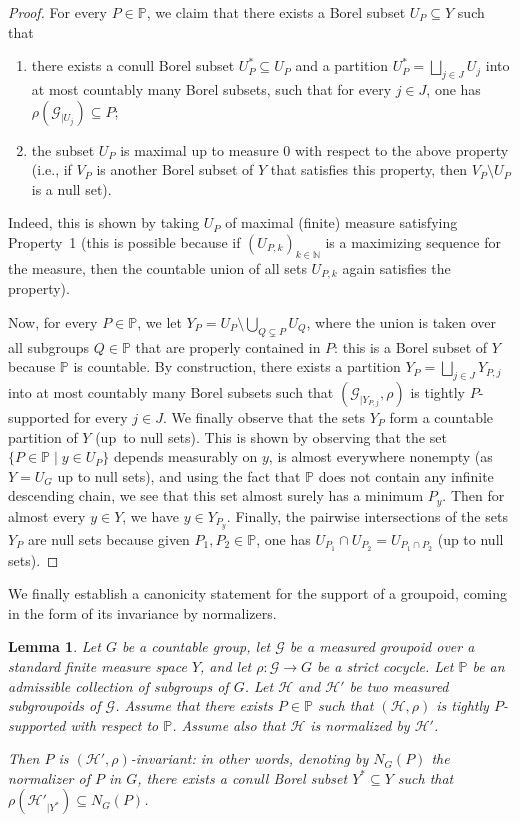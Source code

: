 \documentclass[11pt]{article}
\newcommand{\ie}{i.e.,\xspace}
\numberwithin{equation}{section}
\let\mathcal\mathscr
\theoremstyle{plain}
\newtheorem{lemma}[theo]{Lemma}
\theoremstyle{definition}
\let\Dunion\bigsqcup
\newcommand{\calg}{\mathcal{G}}
\newcommand{\calh}{\mathcal{H}}
\begin{document}
\begin{proof}
For every $P\in\mathbb{P}$, we claim that there exists a Borel subset $U_P\subseteq Y$ such that
\begin{enumerate}
\item there exists a conull Borel subset $U_P^*\subseteq U_P$ and a partition $U_P^*=\Dunion_{j\in J} U_j$ into at most countably many Borel subsets, such that for every $j\in J$, one has $\rho(\calg_{|U_j})\subseteq P$;
\item the subset $U_P$ is maximal up to measure $0$ with respect to the above property (\ie if $V_P$ is another Borel subset of $Y$ that satisfies this property, then $V_P\setminus U_P$ is a null set).
\end{enumerate}
Indeed, this is shown by taking $U_P$ of maximal (finite) measure satisfying Property~1 (this is possible because if $(U_{P,k})_{k\in\mathbb{N}}$ is a maximizing sequence for the measure, then the countable union of all sets $U_{P,k}$ again satisfies the property).

Now, for every $P\in\mathbb{P}$, we let $Y_P=U_P\setminus\bigcup_{Q\subsetneq P} U_Q$, where the union is taken over all subgroups $Q\in\mathbb{P}$ that are properly contained in $P$: this is a Borel subset of $Y$ because $\mathbb{P}$ is countable. By construction, there exists a partition $Y_P=\Dunion_{j\in J}Y_{P,j}$ into at most countably many Borel subsets such that $(\calg_{|Y_{P,j}},\rho)$ is tightly $P$-supported for every $j\in J$. We finally observe that the sets $Y_P$ form a countable partition of $Y$ (up~to null sets). This is shown by observing that the set $\{P\in\mathbb{P}\mid y\in U_P\}$ depends measurably on $y$, is almost everywhere nonempty (as $Y=U_G$ up to null sets), and using the fact that $\mathbb{P}$ does not contain any infinite descending chain, we see that this set almost surely has a minimum $P_y$. Then for almost every $y\in Y$, we have $y\in Y_{P_y}$. Finally, the pairwise intersections of the sets $Y_P$ are null sets because given $P_1,P_2\in\mathbb{P}$, one has $U_{P_1}\cap U_{P_2}=U_{P_1\cap P_2}$ (up to null sets).
\end{proof}

We finally establish a canonicity statement for the support of a groupoid, coming in the form of its invariance by normalizers.

\begin{lemma}\label{lemma:support-invariant-normal}
Let $G$ be a countable group, let $\calg$ be a measured groupoid over a standard finite measure space $Y$, and let $\rho:\calg\to G$ be a strict cocycle. Let $\mathbb{P}$ be an admissible collection of subgroups of $G$. Let $\calh$ and $\calh'$ be two measured subgroupoids of $\calg$. Assume that there exists $P\in\mathbb{P}$ such that $(\calh,\rho)$ is tightly $P$-supported with respect to $\mathbb{P}$. Assume also that $\calh$ is normalized by $\calh'$.

Then $P$ is $(\calh',\rho)$-invariant: in other words, denoting by $N_G(P)$ the normalizer of $P$ in $G$, there exists a conull Borel subset $Y^*\subseteq Y$ such that $\rho(\calh'_{|Y^*})\subseteq N_G(P)$.
\end{lemma}
\end{document}
